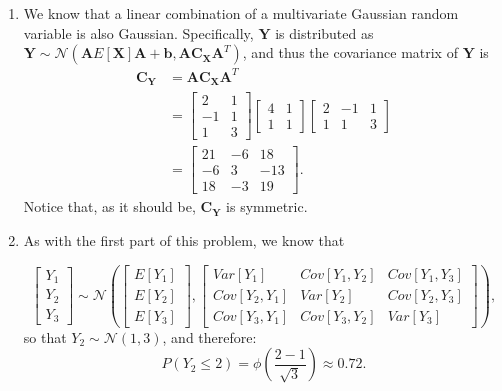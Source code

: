 \begin{problem}{15}
\begin{enumerate}
\item  We know that a linear combination of a multivariate Gaussian random variable is also Gaussian.  Specifically, $\bm Y$ is distributed as $\bm Y\sim \mathcal N(\bm A E[\bm X] \bm A+\bm b, \bm A \bm{C_X} \bm A^T)$, and thus the covariance matrix of $\bm Y$ is
\begin{align*}
\bm{C_Y}& =  \bm A \bm{C_X} \bm A^T \\
&=\left[\begin{matrix}
    2 & 1 \\
    -1 & 1 \\
    1 & 3  
\end{matrix}\right] \left[\begin{matrix}
    4 & 1 \\
    1 & 1
\end{matrix}\right] \left[\begin{matrix}
    2 & -1 &1 \\
    1 & 1 & 3 
\end{matrix}\right] \\
& = \left[\begin{matrix}
    21& -6 &18 \\
    -6& 3 & -13 \\
    18& -3 &19 
\end{matrix}\right].
\end{align*}
Notice that, as it should be, $\bm{C_Y}$ is symmetric.

\item As with the first part of this problem, we know that

\begin{equation*}
\begin{bmatrix} Y_1 \\Y_2 \\Y_3 \end{bmatrix} \sim \mathcal N \left(\begin{bmatrix} E[Y_1] \\ E[Y_2]  \\ E[Y_3] \end{bmatrix},   \left[\begin{matrix}
    Var[Y_1] & Cov[Y_1, Y_2] & Cov[Y_1, Y_3] \\
    Cov[Y_2, Y_1] & Var[Y_2] & Cov[Y_2, Y_3] \\
    Cov[Y_3, Y_1] & Cov[Y_3, Y_2] & Var[Y_3]
\end{matrix}\right] \right),
\end{equation*}
so that $Y_2 \sim \mathcal N(1, 3)$, and therefore:
\begin{equation*}
P(Y_2 \le 2) = \phi \left(\frac{2-1}{\sqrt{3}} \right) \approx 0.72.
\end{equation*}

\end{enumerate}

\end{problem}

